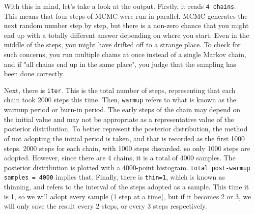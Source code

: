 \documentclass{ltjsarticle}
\begin{document}



With this in mind, let's take a look at the output. Firstly, it reads \texttt{4 chains}. This means that four steps of MCMC were run in parallel. MCMC generates the next random number step by step, but there is a non-zero chance that you might end up with a totally different answer depending on where you start. Even in the middle of the steps, you might have drifted off to a strange place. To check for such concerns, you run multiple chains at once instead of a single Markov chain, and if "all chains end up in the same place", you judge that the sampling has been done correctly.

Next, there is \texttt{iter}. This is the total number of steps, representing that each chain took 2000 steps this time. Then, \texttt{warmup} refers to what is known as the warmup period or burn-in period. The early steps of the chain may depend on the initial value and may not be appropriate as a representative value of the posterior distribution. To better represent the posterior distribution, the method of not adopting the initial period is taken, and that is recorded as the first 1000 steps. 2000 steps for each chain, with 1000 steps discarded, so only 1000 steps are adopted. However, since there are 4 chains, it is a total of 4000 samples. The posterior distribution is plotted with a 4000-point histogram. \texttt{total post-warmup samples = 4000} implies that. Finally, there is \texttt{thin=1}, which is known as thinning, and refers to the interval of the steps adopted as a sample. This time it is 1, so we will adopt every sample (1 step at a time), but if it becomes 2 or 3, we will only save the result every 2 steps, or every 3 steps respectively.
\end{document}
